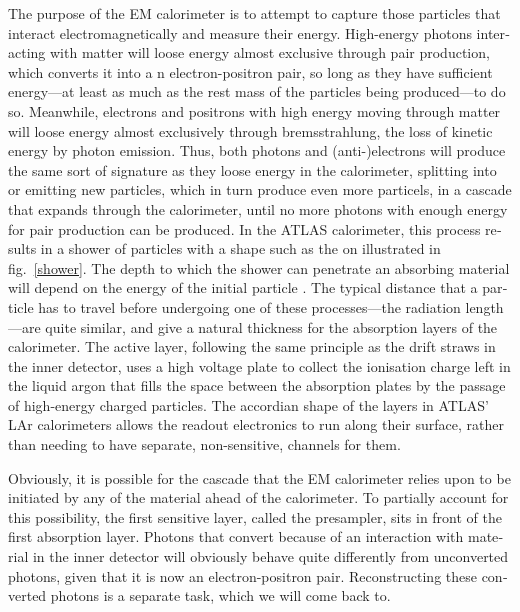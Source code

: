 \begin{english}
The purpose of the EM calorimeter is to attempt to capture those particles that interact electromagnetically and measure their energy. High-energy photons interacting with matter will loose energy almost exclusive through pair production, which converts it into a n electron-positron pair, so long as they have sufficient energy---at least as much as the rest mass of the particles being produced---to do so. Meanwhile, electrons and positrons with high energy moving through matter will loose energy almost exclusively through bremsstrahlung, the loss of kinetic energy by photon emission. Thus, both photons and (anti-)electrons will produce the same sort of signature as they loose energy in the calorimeter, splitting into or emitting new particles, which in turn produce even more particels, in a cascade that expands through the calorimeter, until no more photons with enough energy for pair production can be produced. In the ATLAS calorimeter, this process results in a shower of particles with a shape such as the on illustrated in fig.~\ref{shower}. The depth to which the shower can penetrate an absorbing material will depend on the energy of the initial particle \cite{fernow:sampcal}. The typical distance that a particle has to travel before undergoing one of these processes---the radiation length---are quite similar, and give a natural thickness for the absorption layers of the calorimeter. The active layer, following the same principle as the drift straws in the inner detector, uses a high voltage plate to collect the ionisation charge left in the liquid argon that fills the space between the absorption plates by the passage of high-energy charged particles. The accordian shape of the layers in ATLAS' LAr calorimeters allows the readout electronics to run along their surface, rather than needing to have separate, non-sensitive, channels for them.

Obviously, it is possible for the cascade that the EM calorimeter relies upon to be initiated by any of the material ahead of the calorimeter. To partially account for this possibility, the first sensitive layer, called the presampler, sits in front of the first absorption layer. Photons that convert because of an interaction with material in the inner detector will obviously behave quite differently from unconverted photons, given that it is now an electron-positron pair. Reconstructing these converted photons is a separate task, which we will come back to.


\end{english}
